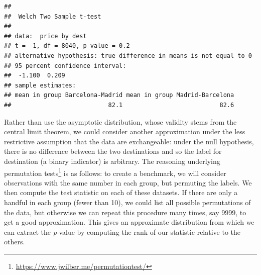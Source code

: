 \documentclass[
  11pt,
  letterpaper,
]{book}
\renewcommand{\href}[2]{#2\footnote{\url{#1}}}
\theoremstyle{definition}
\theoremstyle{definition}
\theoremstyle{definition}
\theoremstyle{remark}
\begin{document}
\begin{verbatim}
## 
## 	Welch Two Sample t-test
## 
## data:  price by dest
## t = -1, df = 8040, p-value = 0.2
## alternative hypothesis: true difference in means is not equal to 0
## 95 percent confidence interval:
##  -1.100  0.209
## sample estimates:
## mean in group Barcelona-Madrid mean in group Madrid-Barcelona 
##                           82.1                           82.6
\end{verbatim}

Rather than use the asymptotic distribution, whose validity stems from the central limit theorem, we could consider another approximation under the less restrictive assumption that the data are exchangeable: under the null hypothesis, there is no difference between the two destinations and so the label for destination (a binary indicator) is arbitrary. The reasoning underlying \href{https://www.jwilber.me/permutationtest/}{permutation tests} is as follows: to create a benchmark, we will consider observations with the same number in each group, but permuting the labels. We then compute the test statistic on each of these datasets. If there are only a handful in each group (fewer than 10), we could list all possible permutations of the data, but otherwise we can repeat this procedure many times, say 9999, to get a good approximation. This gives an approximate distribution from which we can extract the \emph{p}-value by computing the rank of our statistic relative to the others.
\end{document}
